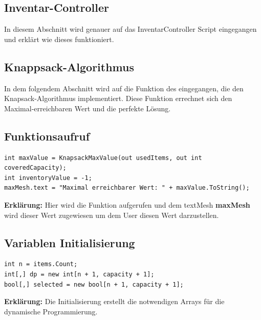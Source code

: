 \subsection{Inventar-Controller}
In diesem Abschnitt wird genauer auf das InventarController Script eingegangen und erklärt wie dieses funktioniert.


\subsection{Knappsack-Algorithmus}
In dem folgendem Abschnitt wird auf die Funktion  des  eingegangen, die den Knapsack-Algorithmus
implementiert. Diese Funktion errechnet sich den Maximal-erreichbaren Wert und die perfekte Lösung.

\subsection*{Funktionsaufruf}
\begin{lstlisting}[style=csharp, caption={}, label=code:init]
int maxValue = KnapsackMaxValue(out usedItems, out int coveredCapacity);
int inventoryValue = -1;
maxMesh.text = "Maximal erreichbarer Wert: " + maxValue.ToString();
\end{lstlisting}
\textbf{Erklärung:} Hier wird die Funktion aufgerufen und dem textMesh \textbf{maxMesh} wird dieser Wert zugewiesen um dem User diesen Wert darzustellen.\\

\subsection*{Variablen Initialisierung}
\begin{lstlisting}[style=csharp, caption={}, label=code:variable]
int n = items.Count;
int[,] dp = new int[n + 1, capacity + 1];
bool[,] selected = new bool[n + 1, capacity + 1];
\end{lstlisting}
\textbf{Erklärung:} Die Initialisierung erstellt die notwendigen Arrays für die dynamische Programmierung.\\

